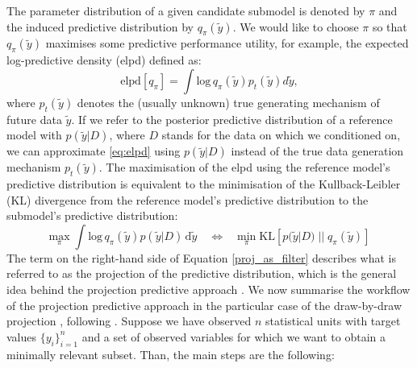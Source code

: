 \documentclass[a4]{article}
\theoremstyle{definition}
\begin{document}
The parameter
distribution of a given candidate submodel is denoted by $\pi$ and the induced predictive
distribution by $q_{\pi}(\tilde{y})$. We would like to choose $\pi$ so
that $q_{\pi}(\tilde{y})$ maximises some predictive performance
utility, for example, the expected log-predictive density (elpd)
defined as: \
\begin{equation}\label{eq:elpd}
\text{elpd}[q_{\pi}]=\int \text{log}\,q_{\pi}(\tilde{y})p_{t}(\tilde{y})d\tilde{y},
\end{equation}
where $p_{t}(\tilde{y})$ denotes the (usually unknown) true generating
mechanism of future data $\tilde{y}$. If we refer to the posterior
predictive distribution of a reference model with $p(\tilde{y}|D)$,
where $D$ stands for the data on which we conditioned on, we can
approximate \eqref{eq:elpd} using $p(\tilde{y}|D)$ instead of the true
data generation mechanism $p_{t}(\tilde{y})$. The maximisation of the
elpd using the reference model's predictive distribution is equivalent
to the minimisation of the Kullback-Leibler (KL) divergence from the
reference model's predictive distribution to the submodel's predictive
distribution: \
\begin{equation} \label{proj_as_filter}
\underset{\pi}{\text{max}} \; \int \text{log}\,q_{\pi}(\tilde{y})p(\tilde{y}|D)
\, \text{d} \tilde{y} 
\quad \Leftrightarrow \quad 
\underset{\pi}{\text{min}} \; \text{KL}[p(\tilde{y}|D) \; || \; q_{\pi}(\tilde{y})] 
\end{equation}
The term on the right-hand side of Equation \eqref{proj_as_filter}
describes what is referred to as the projection of the predictive
distribution, which is the general idea behind the projection
predictive approach \cite[see][]{paper:projpred}. 
We now summarise the workflow of the projection predictive approach in
the particular case of the draw-by-draw projection \cite[original
formulation by][]{paper:original_proj}, following
\cite{paper:projpred}. Suppose we have observed $n$ statistical units
with target values $\{y_{i}\}_{i=1}^{n}$ and a set of observed
variables for which we want to obtain a minimally relevant
subset. Than, the main steps are the following:
\end{document}
